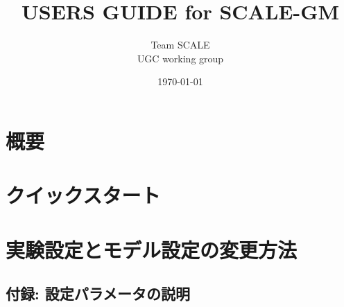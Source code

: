 \documentclass[a4paper]{jreport}
\title{{\Huge USERS GUIDE for SCALE-GM\\
        \vspace{2cm}{\Large Version \version} }}
\author{\Large Team SCALE\\ UGC working group}
\date{\today}
\begin{document}
\maketitle


\clearpage
\tableofcontents

\chapter{概要}\label{chap:overview}


\chapter{クイックスタート}\label{chap:quickstart}


\chapter{実験設定とモデル設定の変更方法}\label{chap:settings}


%

\clearpage


\begin{appendix}
\chapter{付録: 設定パラメータの説明}

\end{appendix}

\end{document}
